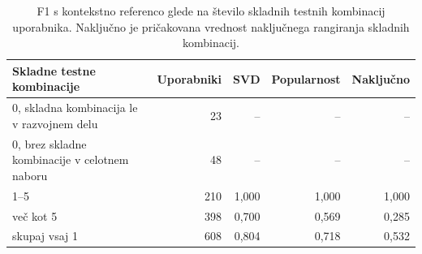\begin{table}[htbp]
\centering
\caption{F1 s kontekstno referenco glede na število skladnih testnih kombinacij uporabnika. Naključno je pričakovana vrednost naključnega rangiranja skladnih kombinacij.}
\label{tab:context_breakdown}
\footnotesize
\begin{tabular}{lrrrr}
\toprule
Skladne testne kombinacije & Uporabniki & SVD & Popularnost & Naključno \\
\midrule
0, skladna kombinacija le v razvojnem delu & 23 & -- & -- & -- \\
0, brez skladne kombinacije v celotnem naboru & 48 & -- & -- & -- \\
1–5 & 210 & 1,000 & 1,000 & 1,000 \\
več kot 5 & 398 & 0,700 & 0,569 & 0,285 \\
skupaj vsaj 1 & 608 & 0,804 & 0,718 & 0,532 \\
\bottomrule
\end{tabular}

\end{table}
